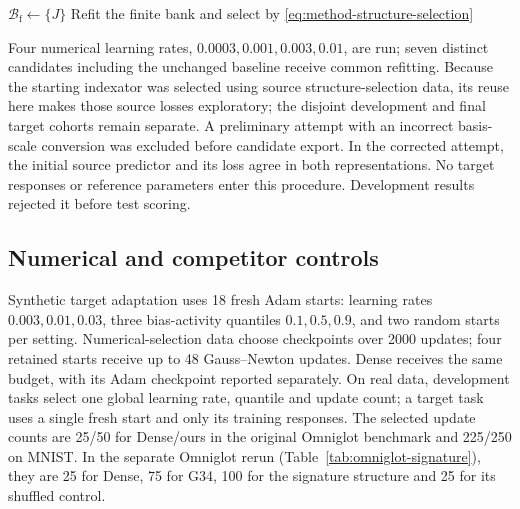 \begin{algorithm}[htbp]
    \small\DontPrintSemicolon\SetAlgoNoEnd
    $\mathcal B_{\mathrm f}\leftarrow\{J\}$\;
    Refit the finite bank and select by
        \eqref{eq:method-structure-selection}\;
    \caption{Conditional functional proposal refinement}
\end{algorithm}

Four numerical learning rates, $0.0003,0.001,0.003,0.01$, are run;
seven distinct candidates including the unchanged baseline receive
common refitting. Because the starting indexator was selected using
source structure-selection data, its reuse here makes those source
losses exploratory; the disjoint development and final target cohorts
remain separate. A preliminary attempt with an incorrect basis-scale
conversion was excluded before candidate export. In the corrected
attempt, the initial source predictor and its loss agree in both
representations. No target responses or reference parameters enter
this procedure. Development results rejected it before test scoring.

\subsection{Numerical and competitor controls}

Synthetic target adaptation uses 18 fresh Adam starts: learning rates
$0.003,0.01,0.03$, three bias-activity quantiles $0.1,0.5,0.9$, and two
random starts per setting. Numerical-selection data choose checkpoints
over 2000 updates; four retained starts receive up to 48 Gauss--Newton
updates. Dense receives the same budget, with its Adam checkpoint
reported separately. On real data, development tasks select one global
learning rate, quantile and update count; a target task uses a single
fresh start and only its training responses. The selected update counts
are 25/50 for Dense/ours in the original Omniglot benchmark and
225/250 on MNIST. In the separate Omniglot rerun
(Table~\ref{tab:omniglot-signature}), they are 25 for Dense, 75 for
G34, 100 for the signature structure and 25 for its shuffled control.

